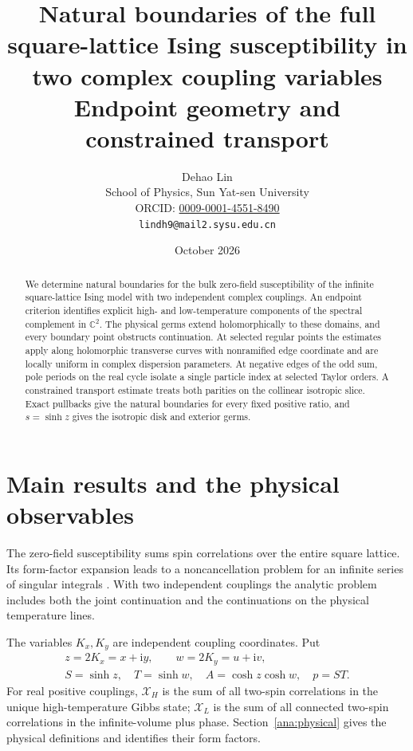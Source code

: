 \documentclass[11pt]{article}
\title{Natural boundaries of the full square-lattice Ising\newline
susceptibility in two complex coupling variables\newline
\large Endpoint geometry and constrained transport}
\author{Dehao Lin\\School of Physics, Sun Yat-sen University\\\small ORCID: \href{https://orcid.org/0009-0001-4551-8490}{0009-0001-4551-8490}\\\small\texttt{lindh9@mail2.sysu.edu.cn}}
\date{October 2026}
\numberwithin{equation}{section}
\theoremstyle{definition}
\newcommand{\C}{\mathbb C}
\newcommand{\ii}{\mathrm i}
\begin{document}
\maketitle
\begin{abstract}
We determine natural boundaries for the bulk zero-field susceptibility
of the infinite square-lattice Ising model with two independent
complex couplings. An endpoint criterion identifies explicit high-
and low-temperature components of the spectral complement in
\(\C^2\). The physical germs extend holomorphically to these domains,
and every boundary point obstructs continuation. At selected regular
points the estimates apply along holomorphic transverse curves with
nonramified edge coordinate and are locally uniform in complex
dispersion parameters. At negative edges of the odd sum, pole periods
on the real cycle isolate a single particle index at selected Taylor
orders. A constrained transport estimate treats both parities on the
collinear isotropic slice. Exact pullbacks give the natural
boundaries for every fixed positive ratio, and \(s=\sinh z\) gives
the isotropic disk and exterior germs.
\end{abstract}

\section{Main results and the physical observables}
\label{main:statement}

The zero-field susceptibility sums spin correlations over the entire
square lattice. Its form-factor expansion leads to a noncancellation
problem for an infinite series of singular integrals
\cite[Section 3.2]{ONGP}\cite[Section 6]{BHM}. With two independent
couplings the analytic problem includes both the joint continuation
and the continuations on the physical temperature lines.

The variables \(K_x,K_y\) are independent coupling coordinates.
Put
\[
 \begin{gathered}
 z=2K_x=x+\ii y,\qquad w=2K_y=u+\ii v,\\
 S=\sinh z,\quad T=\sinh w,\quad A=\cosh z\cosh w,\quad p=ST.
 \end{gathered}
\]
For real positive couplings, \(\mathcal X_H\) is the sum of all
two-spin correlations in the unique high-temperature Gibbs state;
\(\mathcal X_L\) is the sum of all connected two-spin correlations
in the infinite-volume plus phase. Section~\ref{ana:physical}
gives the physical definitions and identifies their form factors.
\end{document}
